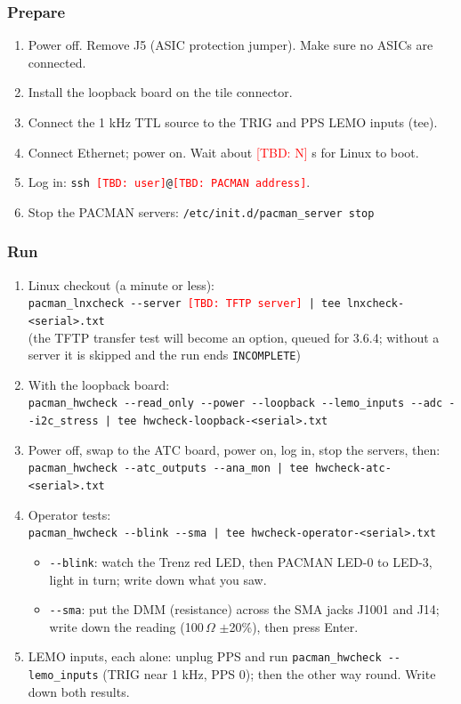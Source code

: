 \documentclass[11pt]{article}
\newcommand{\tbd}[1]{\textcolor{red}{[TBD: #1]}}
\newcommand{\opt}[1]{\texttt{-{}-#1}}
\begin{document}
\subsubsection*{Prepare}
\begin{enumerate}
\item Power off.  Remove J5 (ASIC protection jumper).  Make sure no ASICs are connected.
\item Install the loopback board on the tile connector.
\item Connect the 1 kHz TTL source to the TRIG and PPS LEMO inputs (tee).
\item Connect Ethernet; power on.  Wait about \tbd{N} s for Linux to boot.
\item Log in: \texttt{ssh \tbd{user}@\tbd{PACMAN address}}.
\item Stop the PACMAN servers:  \texttt{/etc/init.d/pacman\_server stop}
\end{enumerate}

\subsubsection*{Run}
\begin{enumerate}
\item Linux checkout (a minute or less):\\
  \texttt{pacman\_lnxcheck -{}-server \tbd{TFTP server} | tee lnxcheck-<serial>.txt}\\
  (the TFTP transfer test will become an option, queued for 3.6.4;  without a server it is skipped and the run ends
  \texttt{INCOMPLETE})
\item With the loopback board:\\
  \texttt{pacman\_hwcheck -{}-read\_only -{}-power -{}-loopback -{}-lemo\_inputs -{}-adc -{}-i2c\_stress
  | tee hwcheck-loopback-<serial>.txt}
\item Power off, swap to the ATC board, power on, log in, stop the servers, then:\\
  \texttt{pacman\_hwcheck -{}-atc\_outputs -{}-ana\_mon | tee hwcheck-atc-<serial>.txt}
\item Operator tests:\\
  \texttt{pacman\_hwcheck -{}-blink -{}-sma | tee hwcheck-operator-<serial>.txt}
  \begin{itemize}
  \item \opt{blink}: watch the Trenz red LED, then PACMAN LED-0 to LED-3, light in turn; write down what you saw.
  \item \opt{sma}: put the DMM (resistance) across the SMA jacks J1001 and J14; write down the reading
    (100\,$\Omega$ $\pm$20\%), then press Enter.
  \end{itemize}
\item LEMO inputs, each alone: unplug PPS and run \texttt{pacman\_hwcheck -{}-lemo\_inputs} (TRIG near 1 kHz,
  PPS 0); then the other way round.  Write down both results.
\end{enumerate}
\end{document}

